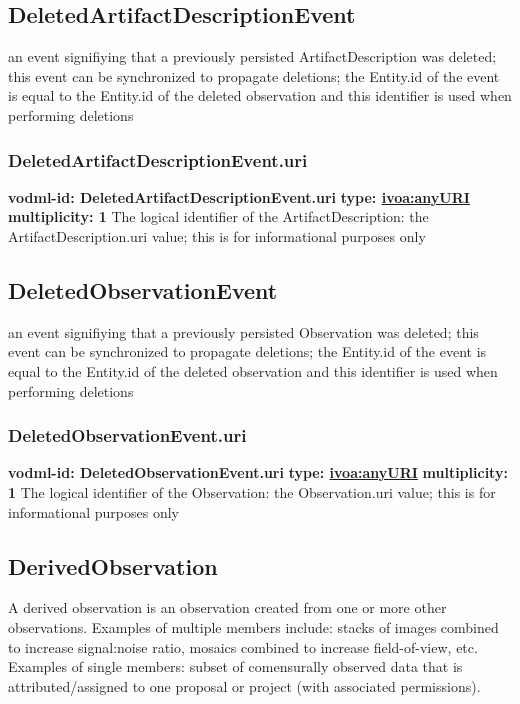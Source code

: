   \subsection{DeletedArtifactDescriptionEvent}
  \label{sect:DeletedArtifactDescriptionEvent}
    an event signifiying that a previously persisted ArtifactDescription was deleted; this event can be synchronized to propagate deletions; the Entity.id of the event is equal to the Entity.id of the deleted observation and this identifier is used when performing deletions

    \subsubsection{DeletedArtifactDescriptionEvent.uri}
      \textbf{vodml-id: DeletedArtifactDescriptionEvent.uri} \newline
      \textbf{type: \hyperref[sect:ivoa]{ivoa:anyURI}} \newline
      \textbf{multiplicity: 1} \newline
      The logical identifier of the ArtifactDescription: the ArtifactDescription.uri value; this is for informational purposes only

  \subsection{DeletedObservationEvent}
  \label{sect:DeletedObservationEvent}
    an event signifiying that a previously persisted Observation was deleted; this event can be synchronized to propagate deletions; the Entity.id of the event is equal to the Entity.id of the deleted observation and this identifier is used when performing deletions

    \subsubsection{DeletedObservationEvent.uri}
      \textbf{vodml-id: DeletedObservationEvent.uri} \newline
      \textbf{type: \hyperref[sect:ivoa]{ivoa:anyURI}} \newline
      \textbf{multiplicity: 1} \newline
      The logical identifier of the Observation: the Observation.uri value; this is for informational purposes only

  \subsection{DerivedObservation}
  \label{sect:DerivedObservation}
    A derived observation is an observation created from one or more other observations. Examples of multiple members include: stacks of images combined to increase signal:noise ratio, mosaics combined to increase field-of-view, etc. Examples of single members: subset of comensurally observed data that is attributed/assigned to one proposal or project (with associated permissions).

